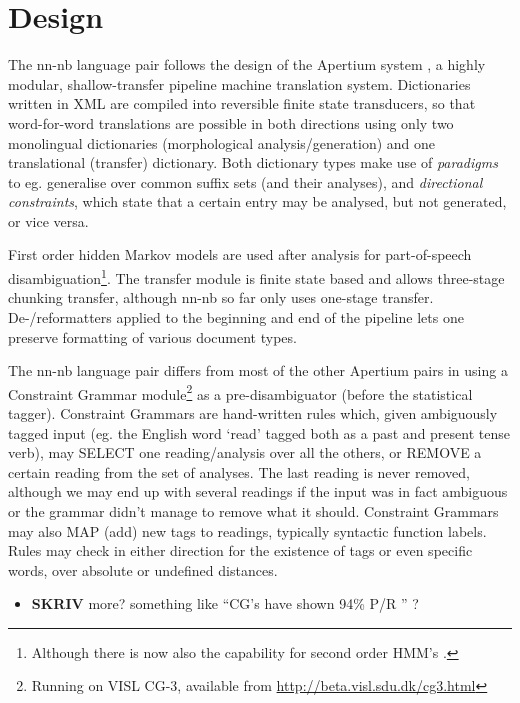 \documentclass[11pt]{article}
\begin{document}
\section{Design}
 \label{SEC:design}

 The nn-nb language pair follows the design of the Apertium system
 \citep{corbi05oss}, a highly modular, shallow-transfer pipeline
 machine translation system. Dictionaries written in XML are compiled
 into reversible finite state transducers, so that word-for-word
 translations are possible in both directions using only two
 monolingual dictionaries (morphological analysis/generation) and one
 translational (transfer) dictionary. Both dictionary types make use of
 \emph{paradigms} to eg. generalise over common suffix sets (and
 their analyses), and \emph{directional constraints}, which state that
 a certain entry may be analysed, but not generated, or vice versa.

 First order hidden Markov models are used after analysis for
 part-of-speech disambiguation\footnote{Although there is now also the
   capability for second order HMM's \citep{sheikh2009trigram}. }.
 The transfer module is finite state based and allows three-stage
 chunking transfer, although nn-nb so far only uses one-stage
 transfer.
 De-/reformatters
 applied to the beginning and end of the pipeline lets one preserve
 formatting of various document types.

The nn-nb language pair differs from most of the other Apertium pairs
in using a Constraint Grammar module\footnote{Running on VISL CG-3,
  available from
  \href{http://beta.visl.sdu.dk/cg3.html}{http://beta.visl.sdu.dk/cg3.html}
} as a pre-disambiguator (before the statistical tagger). Constraint
Grammars \citep{karlsson1990cgf} are hand-written rules which, given
ambiguously tagged input (eg. the English word `read' tagged both as a
past and present tense verb), may SELECT one reading/analysis over all
the others, or REMOVE a certain reading from the set of analyses. The
last reading is never removed, although we may end up with several
readings if the input was in fact ambiguous or the grammar didn't
manage to remove what it should. Constraint Grammars may also MAP
(add) new tags to readings, typically syntactic function labels. Rules
may check in either direction for the existence of tags or even
specific words, over absolute or undefined distances.

\begin{itemize}
\item \textbf{SKRIV} more? something like ``CG's have shown 94\%  P/R \citet{someone}'' ?
\end{itemize} 
\end{document}
